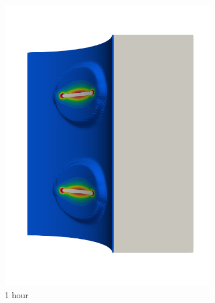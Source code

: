 \begin{figure}[!htb]
\begin{subfigure}[b]{0.2\textwidth}
    \includegraphics[width=\textwidth]{Chapter5/figures/spallation/seed_ep_5}
    \caption{1 hour}
  \end{subfigure}
  \begin{subfigure}[b]{0.2\textwidth}
    \centering

\end{subfigure}
\end{figure}
